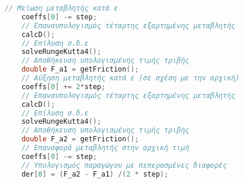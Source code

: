 \begin{lstlisting}[language=C++]
	// Μείωση μεταβλητής κατά ε
    coeffs[0] -= step;
	// Επαναυπολογισμός τέταρτης εξαρτημένης μεταβλητής
    calcD();
    // Επίλυση σ.δ.ε
    solveRungeKutta4();
	// Αποθήκευση υπολογισμένης τιμής τριβής
    double F_a1 = getFriction();
	// Αύξηση μεταβλητής κατά ε (σε σχέση με την αρχική)
    coeffs[0] += 2*step;
	// Επαναυπολογισμός τέταρτης εξαρτημένης μεταβλητής
    calcD();
    // Επίλυση σ.δ.ε
    solveRungeKutta4();
	// Αποθήκευση υπολογισμένης τιμής τριβής
    double F_a2 = getFriction();
    // Επαναφορά μεταβλητής στην αρχική τιμή
    coeffs[0] -= step; 
    // Υπολογισμός παραγώγου με πεπερασμένες διαφορές
    der[0] = (F_a2 - F_a1) /(2 * step);
\end{lstlisting}

